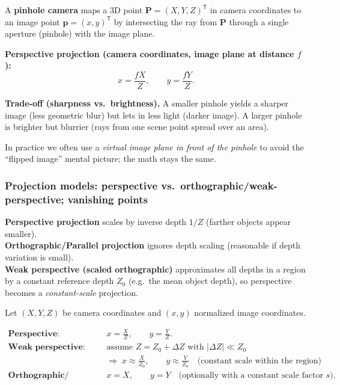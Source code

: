 \documentclass[11pt,a4paper]{article}
\newcommand{\vct}[1]{\bm{#1}}
\newcommand{\T}{^\mathsf{T}}
\begin{document}
\begin{defbox}
A \textbf{pinhole camera} maps a 3D point $\vct{P}=(X,Y,Z)\T$ in camera coordinates to an image point
$\vct{p}=(x,y)\T$ by intersecting the ray from $\vct{P}$ through a single aperture (pinhole) with the image plane.
\end{defbox}

\begin{mathrule}
\textbf{Perspective projection (camera coordinates, image plane at distance $f$):}
\[
x = \frac{fX}{Z},\qquad y = \frac{fY}{Z}.
\]
\end{mathrule}

\begin{intbox}
\textbf{Trade-off (sharpness vs.\ brightness).}
A smaller pinhole yields a sharper image (less geometric blur) but lets in less light (darker image).
A larger pinhole is brighter but blurrier (rays from one scene point spread over an area).
\end{intbox}

\begin{notebox}
In practice we often use a \emph{virtual image plane in front of the pinhole} to avoid the ``flipped image'' mental picture;
the math stays the same.
\end{notebox}

\subsubsection{Projection models: perspective vs.\ orthographic/weak-perspective; vanishing points}

\begin{defbox}
\textbf{Perspective projection} scales by inverse depth $1/Z$ (farther objects appear smaller). \\
\textbf{Orthographic/Parallel projection} ignores depth scaling (reasonable if depth variation is small). \\
\textbf{Weak perspective (scaled orthographic)} approximates all depths in a region by a constant reference depth
$Z_0$ (e.g.\ the mean object depth), so perspective becomes a \emph{constant-scale} projection.
\end{defbox}

\begin{mathrule}
Let $(X,Y,Z)$ be camera coordinates and $(x,y)$ normalized image coordinates.

\begin{align*}
\textbf{Perspective:}\quad
& x = \frac{X}{Z}, \qquad y = \frac{Y}{Z}. \\[2pt]
\textbf{Weak perspective:}\quad
& \text{assume } Z = Z_0 + \Delta Z \text{ with } |\Delta Z|\ll Z_0 \\
& \Rightarrow\; x \approx \frac{X}{Z_0}, \qquad y \approx \frac{Y}{Z_0}
\quad \text{(constant scale within the region)} \\
\textbf{Orthographic/Parallel:}\quad
& x = X, \qquad y = Y
\quad \text{(optionally with a constant scale factor } s\text{).}
\end{align*}
\end{mathrule}
\end{document}

